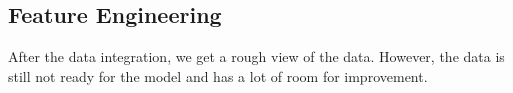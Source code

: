 \documentclass[8pt]{report}
\begin{document}


\subsection{Feature Engineering}
After the data integration, we get a rough view of the data. However, the data is still not ready for the model and has a lot of room for improvement.
\end{document}
